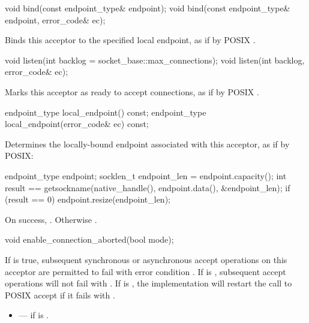 \begin{itemdecl}
void bind(const endpoint_type& endpoint);
void bind(const endpoint_type& endpoint, error_code& ec);
\end{itemdecl}

\begin{itemdescr}
\pnum
\effects Binds this acceptor to the specified local endpoint, as if by POSIX .
\end{itemdescr}

\begin{itemdecl}
void listen(int backlog = socket_base::max_connections);
void listen(int backlog, error_code& ec);
\end{itemdecl}

\begin{itemdescr}
\pnum
\effects Marks this acceptor as ready to accept connections, as if by POSIX .
\end{itemdescr}

\begin{itemdecl}
endpoint_type local_endpoint() const;
endpoint_type local_endpoint(error_code& ec) const;
\end{itemdecl}

\begin{itemdescr}
\pnum
\effects Determines the locally-bound endpoint associated with this acceptor, as if by POSIX: 
\begin{codeblock}
endpoint_type endpoint;
socklen_t endpoint_len = endpoint.capacity();
int result == getsockname(native_handle(), endpoint.data(), &endpoint_len);
if (result == 0)
  endpoint.resize(endpoint_len);
\end{codeblock}


\pnum
\returns On success, . Otherwise .
\end{itemdescr}

\begin{itemdecl}
void enable_connection_aborted(bool mode);
\end{itemdecl}

\begin{itemdescr}
\pnum
\effects If  is true, subsequent synchronous or asynchronous accept operations on this acceptor are permitted to fail with error condition . If  is , subsequent accept operations will not fail with . \enternote If  is , the implementation will restart the call to POSIX accept if it fails with . \exitnote

\pnum
\errors
\begin{itemize}
\item
{} --- if  is .
\end{itemize}
\end{itemdescr}

